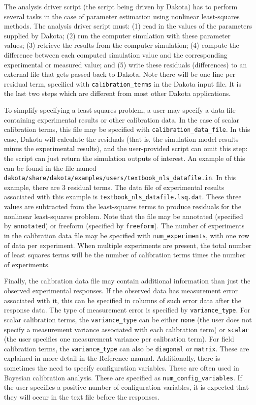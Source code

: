 The analysis driver script (the script being driven by Dakota) has to
perform several tasks in the case of parameter estimation using
nonlinear least-squares methods. The analysis driver script must: (1)
read in the values of the parameters supplied by Dakota; (2) run the
computer simulation with these parameter values; (3) retrieve the
results from the computer simulation; (4) compute the difference
between each computed simulation value and the corresponding
experimental or measured value; and (5) write these residuals
(differences) to an external file that gets passed back to
Dakota. Note there will be one line per residual term, specified with
\texttt{calibration\_terms} in the Dakota input file. It is the last
two steps which are different from most other Dakota applications.

To simplify specifying a least squares problem, a user may specify a
data file containing experimental results or other calibration data.
In the case of scalar calibration terms, 
this file may be specified with \texttt{calibration\_data\_file}.  In
this case, Dakota will calculate the residuals (that is, the
simulation model results minus the experimental results), and the
user-provided script can omit this step: the script can just return
the simulation outputs of interest. An example of this can be found in
the file named
\texttt{dakota/share/dakota/examples/users/textbook\_nls\_datafile.in}.  In this
example, there are 3 residual terms. The data file of experimental
results associated with this example is
\texttt{textbook\_nls\_datafile.lsq.dat}.  These three values are
subtracted from the least-squares terms to produce residuals for the
nonlinear least-squares problem.  Note that the file may be annotated
(specified by \texttt{annotated}) or freeform (specified by
\texttt{freeform}). The number of experiments in the calibration data
file may be specified with \texttt{num\_experiments}, with one row of
data per experiment. 
When multiple experiments are present, the total number of least 
squares terms will be the number of calibration terms times the number of 
experiments.

Finally, the calibration data file may contain additional 
information than just
the observed experimental responses. If the observed data has
measurement error associated with it, this can be specified in columns
of such error data after the response data.  The type of measurement 
error is specified by \texttt{variance\_type}.  For scalar 
calibration terms, the \texttt{variance\_type} can be either \texttt{none} 
(the user does not specify a measurement variance associated with each 
calibration term) or \texttt{scalar} (the user specifies one measurement variance 
per calibration term). 
For field calibration terms, the \texttt{variance\_type} can also 
be \texttt{diagonal} or \texttt{matrix}.  These are explained in 
more detail in the Reference manual.
Additionally, there is sometimes the
need to specify configuration variables.  These are often used in
Bayesian calibration analysis. These are specified as
\texttt{num\_config\_variables}. If the user specifies a positive
number of configuration variables, it is expected that they will occur
in the text file before the responses.

